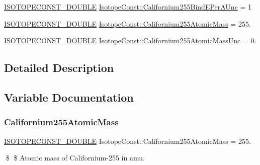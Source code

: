 \begin{DoxyCompactItemize}
\mbox{\hyperlink{group___isotope_const-_macros_ga8f45a7272ce02c0b4c65c44636ed719a}{I\+S\+O\+T\+O\+P\+E\+C\+O\+N\+S\+T\+\_\+\+D\+O\+U\+B\+LE}} \mbox{\hyperlink{group___isotope_const-_californium-_cf255_ga50244f06d53e604d01fa1411b2f52807}{Isotope\+Const\+::\+Californium255\+Bind\+E\+Per\+A\+Unc}} = 1
\item 
\mbox{\hyperlink{group___isotope_const-_macros_ga8f45a7272ce02c0b4c65c44636ed719a}{I\+S\+O\+T\+O\+P\+E\+C\+O\+N\+S\+T\+\_\+\+D\+O\+U\+B\+LE}} \mbox{\hyperlink{group___isotope_const-_californium-_cf255_gadd01468a8ff27c3c05023da339997815}{Isotope\+Const\+::\+Californium255\+Atomic\+Mass}} = 255.
\item 
\mbox{\hyperlink{group___isotope_const-_macros_ga8f45a7272ce02c0b4c65c44636ed719a}{I\+S\+O\+T\+O\+P\+E\+C\+O\+N\+S\+T\+\_\+\+D\+O\+U\+B\+LE}} \mbox{\hyperlink{group___isotope_const-_californium-_cf255_ga6ea4166f75bf5b3ec50cf2f2c1ce3779}{Isotope\+Const\+::\+Californium255\+Atomic\+Mass\+Unc}} = 0.
\end{DoxyCompactItemize}


\subsection{Detailed Description}


\subsection{Variable Documentation}
\mbox{\label{group___isotope_const-_californium-_cf255_gadd01468a8ff27c3c05023da339997815}} 
\subsubsection{\texorpdfstring{Californium255\+Atomic\+Mass}{Californium255AtomicMass}}
{\footnotesize\ttfamily \mbox{\hyperlink{group___isotope_const-_macros_ga8f45a7272ce02c0b4c65c44636ed719a}{I\+S\+O\+T\+O\+P\+E\+C\+O\+N\+S\+T\+\_\+\+D\+O\+U\+B\+LE}} Isotope\+Const\+::\+Californium255\+Atomic\+Mass = 255.}

\$ \$ Atomic mass of Californium-\/255 in amu. \mbox{\label{group___isotope_const-_californium-_cf255_ga6ea4166f75bf5b3ec50cf2f2c1ce3779}} 
